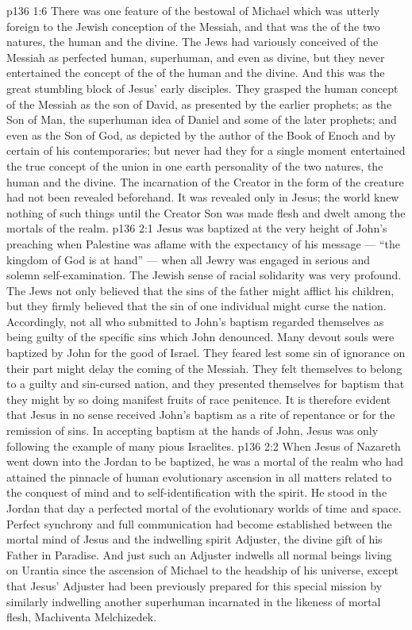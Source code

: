 \vs p136 1:6 There was one feature of the bestowal of Michael which was utterly foreign to the Jewish conception of the Messiah, and that was the  of the two natures, the human and the divine. The Jews had variously conceived of the Messiah as perfected human, superhuman, and even as divine, but they never entertained the concept of the  of the human and the divine. And this was the great stumbling block of Jesus’ early disciples. They grasped the human concept of the Messiah as the son of David, as presented by the earlier prophets; as the Son of Man, the superhuman idea of Daniel and some of the later prophets; and even as the Son of God, as depicted by the author of the Book of Enoch and by certain of his contemporaries; but never had they for a single moment entertained the true concept of the union in one earth personality of the two natures, the human and the divine. The incarnation of the Creator in the form of the creature had not been revealed beforehand. It was revealed only in Jesus; the world knew nothing of such things until the Creator Son was made flesh and dwelt among the mortals of the realm.
\vs p136 2:1 Jesus was baptized at the very height of John’s preaching when Palestine was aflame with the expectancy of his message --- “the kingdom of God is at hand” --- when all Jewry was engaged in serious and solemn self\hyp{}examination. The Jewish sense of racial solidarity was very profound. The Jews not only believed that the sins of the father might afflict his children, but they firmly believed that the sin of one individual might curse the nation. Accordingly, not all who submitted to John’s baptism regarded themselves as being guilty of the specific sins which John denounced. Many devout souls were baptized by John for the good of Israel. They feared lest some sin of ignorance on their part might delay the coming of the Messiah. They felt themselves to belong to a guilty and sin\hyp{}cursed nation, and they presented themselves for baptism that they might by so doing manifest fruits of race penitence. It is therefore evident that Jesus in no sense received John’s baptism as a rite of repentance or for the remission of sins. In accepting baptism at the hands of John, Jesus was only following the example of many pious Israelites.
\vs p136 2:2 \pc When Jesus of Nazareth went down into the Jordan to be baptized, he was a mortal of the realm who had attained the pinnacle of human evolutionary ascension in all matters related to the conquest of mind and to self\hyp{}identification with the spirit. He stood in the Jordan that day a perfected mortal of the evolutionary worlds of time and space. Perfect synchrony and full communication had become established between the mortal mind of Jesus and the indwelling spirit Adjuster, the divine gift of his Father in Paradise. And just such an Adjuster indwells all normal beings living on Urantia since the ascension of Michael to the headship of his universe, except that Jesus’ Adjuster had been previously prepared for this special mission by similarly indwelling another superhuman incarnated in the likeness of mortal flesh, Machiventa Melchizedek.

